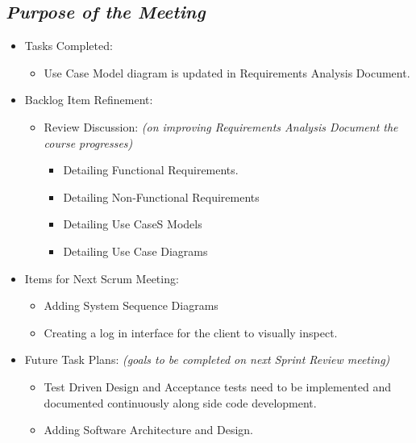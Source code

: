\documentclass[a4paper]{article}
\begin{document}
\subsection{\textit{Purpose of the Meeting}}

\begin{itemize}

\item Tasks Completed:

\begin{itemize}

\item Use Case Model diagram is updated in Requirements Analysis Document.

\end{itemize}

\item Backlog Item Refinement:

\begin{itemize}

\item Review Discussion: \emph{(on improving Requirements Analysis Document the course progresses)}

\begin{itemize}

\item Detailing Functional Requirements.

\item Detailing Non-Functional Requirements

\item Detailing Use CaseS Models

\item Detailing Use Case Diagrams

\end{itemize}

\end{itemize}

\item Items for Next Scrum Meeting:

\begin{itemize}

\item Adding System Sequence Diagrams

\item Creating a log in interface for the client to visually inspect.

\end{itemize}

\item Future Task Plans: \emph{(goals to be completed on next Sprint Review meeting)}

\begin{itemize}

\item Test Driven Design and Acceptance tests need to be implemented and documented continuously along side code development.

\item Adding Software Architecture and Design.

\end{itemize}

\end{itemize}
\end{document}
